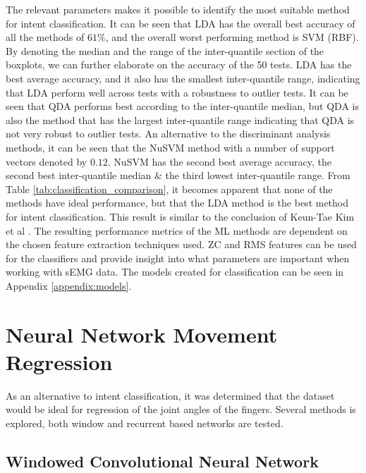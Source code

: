 \documentclass[../main.tex]{subfiles}
\begin{document}
The relevant parameters makes it possible to identify the most suitable method for intent classification.
It can be seen that LDA has the overall best accuracy of all the methods of $61\%$, and the overall worst performing method is SVM (RBF).
By denoting the median and the range of the inter-quantile section of the boxplots, we can further elaborate on the accuracy of the 50 tests.
LDA has the best average accuracy, and it also has the smallest inter-quantile range, indicating that LDA perform well across tests with a robustness to outlier tests. 
It can be seen that QDA performs best according to the inter-quantile median, but QDA is also the method that has the largest inter-quantile range indicating that QDA is not very robust to outlier tests.
An alternative to the discriminant analysis methods, it can be seen that the NuSVM method with a number of support vectors denoted by $0.12$.
NuSVM has the second best average accuracy, the second best inter-quantile median \& the third lowest inter-quantile range.
From Table \ref{tab:classification_comparison}, it becomes apparent that none of the methods have ideal performance, but that the LDA method is the best method for intent classification.
This result is similar to the conclusion of Keun-Tae Kim et al \cite{KeunTaeKim2021}.
The resulting performance metrics of the ML methods are dependent on the chosen feature extraction techniques used.
\gls{ZC} and \gls{RMS} features can be used for the classifiers and provide insight into what parameters are important when working with sEMG data.
The models created for classification can be seen in Appendix \ref{appendix:models}.

\section{Neural Network Movement Regression}
\label{sec:regression}

As an alternative to intent classification, it was determined that the dataset would be ideal for regression of the joint angles of the fingers.
Several methods is explored, both window and recurrent based networks are tested.


\subsection{Windowed Convolutional Neural Network}
\end{document}
